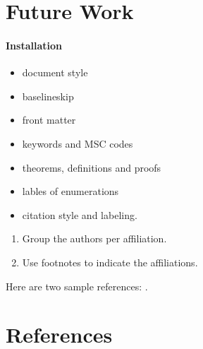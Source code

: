 \documentclass[review]{elsarticle}
\begin{document}
\section{Future Work}
\label{section:future-work}

\paragraph{Installation}

\begin{itemize}
\item document style
\item baselineskip
\item front matter
\item keywords and MSC codes
\item theorems, definitions and proofs
\item lables of enumerations
\item citation style and labeling.
\end{itemize}

\begin{enumerate}[(1)]
\item Group the authors per affiliation.
\item Use footnotes to indicate the affiliations.
\end{enumerate}

Here are two sample references: \cite{Feynman1963118,Dirac1953888}.

\section*{References}


\end{document}
